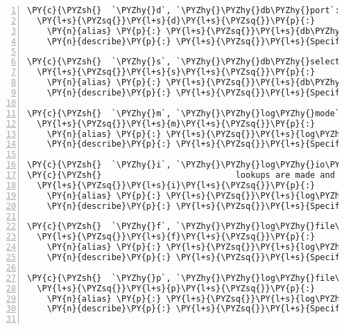 \begin{Verbatim}[fontsize=\scriptsize,commandchars=\\\{\},numbers=left,firstnumber=1,stepnumber=1]
\PY{c}{\PYZsh{}  `\PYZhy{}d`, `\PYZhy{}\PYZhy{}db\PYZhy{}port`: Specify a port for the redis DB}
  \PY{l+s}{\PYZsq{}}\PY{l+s}{d}\PY{l+s}{\PYZsq{}}\PY{p}{:}
    \PY{n}{alias} \PY{p}{:} \PY{l+s}{\PYZsq{}}\PY{l+s}{db\PYZhy{}port}\PY{l+s}{\PYZsq{}}\PY{p}{,}
    \PY{n}{describe}\PY{p}{:} \PY{l+s}{\PYZsq{}}\PY{l+s}{Specify a port for the redis DB}\PY{l+s}{\PYZsq{}}

\PY{c}{\PYZsh{}  `\PYZhy{}s`, `\PYZhy{}\PYZhy{}db\PYZhy{}select`: Specify a database}
  \PY{l+s}{\PYZsq{}}\PY{l+s}{s}\PY{l+s}{\PYZsq{}}\PY{p}{:}
    \PY{n}{alias} \PY{p}{:} \PY{l+s}{\PYZsq{}}\PY{l+s}{db\PYZhy{}select}\PY{l+s}{\PYZsq{}}\PY{p}{,}
    \PY{n}{describe}\PY{p}{:} \PY{l+s}{\PYZsq{}}\PY{l+s}{Specify a database identifier}\PY{l+s}{\PYZsq{}}

\PY{c}{\PYZsh{}  `\PYZhy{}m`, `\PYZhy{}\PYZhy{}log\PYZhy{}mode`: Specify a log mode: [development|productive]}
  \PY{l+s}{\PYZsq{}}\PY{l+s}{m}\PY{l+s}{\PYZsq{}}\PY{p}{:}
    \PY{n}{alias} \PY{p}{:} \PY{l+s}{\PYZsq{}}\PY{l+s}{log\PYZhy{}mode}\PY{l+s}{\PYZsq{}}\PY{p}{,}
    \PY{n}{describe}\PY{p}{:} \PY{l+s}{\PYZsq{}}\PY{l+s}{Specify a log mode: [development|productive]}\PY{l+s}{\PYZsq{}}

\PY{c}{\PYZsh{}  `\PYZhy{}i`, `\PYZhy{}\PYZhy{}log\PYZhy{}io\PYZhy{}level`: Specify the log level for the I/O. in development expensive origin}
\PY{c}{\PYZsh{}                           lookups are made and added to the log entries}
  \PY{l+s}{\PYZsq{}}\PY{l+s}{i}\PY{l+s}{\PYZsq{}}\PY{p}{:}
    \PY{n}{alias} \PY{p}{:} \PY{l+s}{\PYZsq{}}\PY{l+s}{log\PYZhy{}io\PYZhy{}level}\PY{l+s}{\PYZsq{}}\PY{p}{,}
    \PY{n}{describe}\PY{p}{:} \PY{l+s}{\PYZsq{}}\PY{l+s}{Specify the log level for the I/O}\PY{l+s}{\PYZsq{}}

\PY{c}{\PYZsh{}  `\PYZhy{}f`, `\PYZhy{}\PYZhy{}log\PYZhy{}file\PYZhy{}level`: Specify the log level for the log file}
  \PY{l+s}{\PYZsq{}}\PY{l+s}{f}\PY{l+s}{\PYZsq{}}\PY{p}{:}
    \PY{n}{alias} \PY{p}{:} \PY{l+s}{\PYZsq{}}\PY{l+s}{log\PYZhy{}file\PYZhy{}level}\PY{l+s}{\PYZsq{}}\PY{p}{,}
    \PY{n}{describe}\PY{p}{:} \PY{l+s}{\PYZsq{}}\PY{l+s}{Specify the log level for the log file}\PY{l+s}{\PYZsq{}}

\PY{c}{\PYZsh{}  `\PYZhy{}p`, `\PYZhy{}\PYZhy{}log\PYZhy{}file\PYZhy{}path`: Specify the path to the log file within the \PYZdq{}logs\PYZdq{} folder}
  \PY{l+s}{\PYZsq{}}\PY{l+s}{p}\PY{l+s}{\PYZsq{}}\PY{p}{:}
    \PY{n}{alias} \PY{p}{:} \PY{l+s}{\PYZsq{}}\PY{l+s}{log\PYZhy{}file\PYZhy{}path}\PY{l+s}{\PYZsq{}}\PY{p}{,}
    \PY{n}{describe}\PY{p}{:} \PY{l+s}{\PYZsq{}}\PY{l+s}{Specify the path to the log file within the }\PY{l+s}{\PYZdq{}}\PY{l+s}{logs}\PY{l+s}{\PYZdq{}}\PY{l+s}{ folder}\PY{l+s}{\PYZsq{}}


\end{Verbatim}
